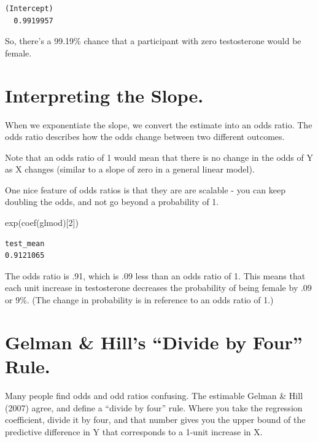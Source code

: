 \documentclass[
  letterpaper,
  DIV=11,
  numbers=noendperiod,
  oneside]{scrreprt}
\newenvironment{Shaded}{\begin{snugshade}}{\end{snugshade}}
\newcommand{\DecValTok}[1]{\textcolor[rgb]{0.68,0.00,0.00}{#1}}
\newcommand{\FunctionTok}[1]{\textcolor[rgb]{0.28,0.35,0.67}{#1}}
\newcommand{\NormalTok}[1]{\textcolor[rgb]{0.00,0.23,0.31}{#1}}
\begin{document}
\begin{verbatim}
(Intercept) 
  0.9919957 
\end{verbatim}

So, there's a 99.19\% chance that a participant with zero testosterone
would be female.

\section{Interpreting the Slope.}\label{interpreting-the-slope.}

When we exponentiate the slope, we convert the estimate into an odds
ratio. The odds ratio describes how the odds change between two
different outcomes.

Note that an odds ratio of 1 would mean that there is no change in the
odds of Y as X changes (similar to a slope of zero in a general linear
model).

One nice feature of odds ratios is that they are are scalable - you can
keep doubling the odds, and not go beyond a probability of 1.

\begin{Shaded}
\begin{Highlighting}[]
\FunctionTok{exp}\NormalTok{(}\FunctionTok{coef}\NormalTok{(glmod)[}\DecValTok{2}\NormalTok{])}
\end{Highlighting}
\end{Shaded}

\begin{verbatim}
test_mean 
0.9121065 
\end{verbatim}

The odds ratio is .91, which is .09 less than an odds ratio of 1. This
means that each unit increase in testosterone decreases the probability
of being female by .09 or 9\%. (The change in probability is in
reference to an odds ratio of 1.)

\section{Gelman \& Hill's ``Divide by Four''
Rule.}\label{gelman-hills-divide-by-four-rule.}

Many people find odds and odd ratios confusing. The estimable Gelman \&
Hill (2007) agree, and define a ``divide by four'' rule. Where you take
the regression coefficient, divide it by four, and that number gives you
the upper bound of the predictive difference in Y that corresponds to a
1-unit increase in X.
\end{document}
